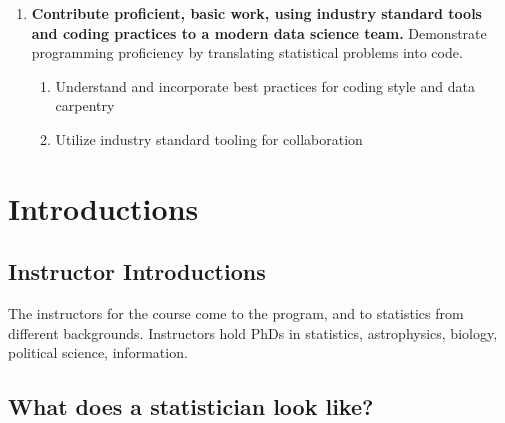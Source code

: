 \documentclass[
]{book}
\providecommand{\tightlist}{%
  \setlength{\itemsep}{0pt}\setlength{\parskip}{0pt}}
\theoremstyle{definition}
\theoremstyle{definition}
\theoremstyle{definition}
\theoremstyle{definition}
\theoremstyle{remark}
\begin{document}
\begin{enumerate}
  \begin{enumerate}
  \def\labelenumii{\arabic{enumii}.}
  \tightlist
  \item
    Identify their audience and report process and findings in a manner appropriate to that audience.
  \item
    Construct regression oriented reports that provide insight for stakeholders.
  \item
    Construct technical documents of process and code for collaboration and reproducability with peer data scientists.
  \item
    Read, understand, and assess the claims that are made in technical, regression oriented reports
  \end{enumerate}
\item
  \textbf{Contribute proficient, basic work, using industry standard tools and coding practices to a modern data science team.}
  Demonstrate programming proficiency by translating statistical problems into code.

  \begin{enumerate}
  \def\labelenumii{\arabic{enumii}.}
  \tightlist
  \item
    Understand and incorporate best practices for coding style and data carpentry
  \item
    Utilize industry standard tooling for collaboration
  \end{enumerate}
\end{enumerate}

\hypertarget{introductions}{%
\section{Introductions}\label{introductions}}

\hypertarget{instructor-introductions}{%
\subsection{Instructor Introductions}\label{instructor-introductions}}

The instructors for the course come to the program, and to statistics from different backgrounds. Instructors hold PhDs in statistics, astrophysics, biology, political science, information.

\hypertarget{what-does-a-statistician-look-like}{%
\subsection{What does a statistician look like?}\label{what-does-a-statistician-look-like}}
\end{document}
